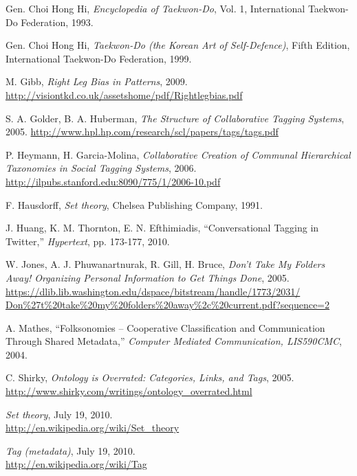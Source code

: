 \documentclass[10pt,twocolumn,a4paper]{article}
\begin{document}
\begin{thebibliography}{99}
    \small  %

      Gen. Choi Hong Hi,
      \emph{Encyclopedia of Taekwon-Do}, Vol. 1,
      International Taekwon-Do Federation, 1993.

      Gen. Choi Hong Hi,
      \emph{Taekwon-Do (the Korean Art of Self-Defence)}, Fifth Edition,
      International Taekwon-Do Federation, 1999.

      M. Gibb,
      \emph{Right Leg Bias in Patterns}, 2009.
      \url{http://visiontkd.co.uk/assetshome/pdf/Rightlegbias.pdf}

      S. A. Golder, B. A. Huberman,
      \emph{The Structure of Collaborative Tagging Systems}, 2005.
      \url{http://www.hpl.hp.com/research/scl/papers/tags/tags.pdf}

      P. Heymann, H. Garcia-Molina,
      \emph{Collaborative Creation of Communal Hierarchical Taxonomies in
      Social Tagging Systems}, 2006.
      \url{http://ilpubs.stanford.edu:8090/775/1/2006-10.pdf}

      F. Hausdorff,
      \emph{Set theory},
      Chelsea Publishing Company, 1991.

      J. Huang, K. M. Thornton, E. N. Efthimiadis,
      ``Conversational Tagging in Twitter,''
      \emph{Hypertext}, pp. 173-177, 2010.

      W. Jones, A. J. Phuwanartnurak, R. Gill, H. Bruce,
      \emph{Don't Take My Folders Away! Organizing Personal Information to Get
      Things Done}, 2005.
      \url{https://dlib.lib.washington.edu/dspace/bitstream/handle/1773/2031/
           Don%

      A. Mathes,
      ``Folksonomies -- Cooperative Classification and Communication Through
      Shared Metadata,''
      \emph{Computer Mediated Communication, LIS590CMC}, 2004.

      C. Shirky,
      \emph{Ontology is Overrated: Categories, Links, and Tags}, 2005.
      \url{http://www.shirky.com/writings/ontology_overrated.html}

      \emph{Set theory}, July 19, 2010. \\
      \url{http://en.wikipedia.org/wiki/Set_theory}

      \emph{Tag (metadata)}, July 19, 2010. \\
      \url{http://en.wikipedia.org/wiki/Tag}

\end{thebibliography}
\end{document}

